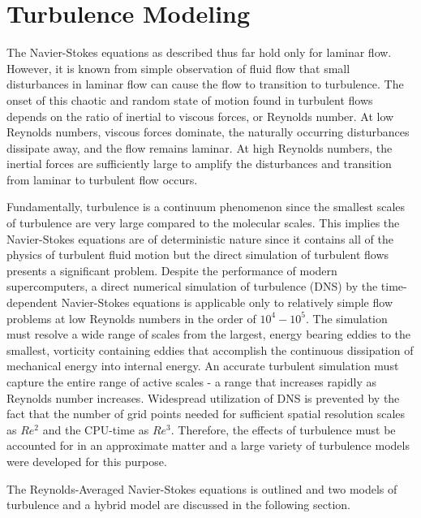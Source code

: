 \section{Turbulence Modeling}

The Navier-Stokes equations as described thus far hold only for laminar flow. However, it is known from simple observation of fluid flow that small disturbances in laminar flow can cause the flow to transition to turbulence. The onset of this chaotic and random state of motion found in turbulent flows depends on the ratio of inertial to viscous forces, or Reynolds number. At low Reynolds numbers, viscous forces dominate, the naturally occurring disturbances dissipate away, and the flow remains laminar. At high Reynolds numbers, the inertial forces are sufficiently large to amplify the disturbances and transition from laminar to turbulent flow occurs.

Fundamentally, turbulence is a continuum phenomenon since the smallest scales of turbulence are very large compared to the molecular scales. This implies the Navier-Stokes equations are of deterministic nature since it contains all of the physics of turbulent fluid motion \cite{BlazekText} but the direct simulation of turbulent flows presents a significant problem. Despite the performance of modern supercomputers, a direct numerical simulation of turbulence (DNS) by the time-dependent Navier-Stokes equations is applicable only to relatively simple flow problems at low Reynolds numbers in the order of $10^4 \minus 10^5$. The simulation must resolve a wide range of scales from the largest, energy bearing eddies to the smallest, vorticity containing eddies that accomplish the continuous dissipation of mechanical energy into internal energy. An accurate turbulent simulation must capture the entire range of active scales - a range that increases rapidly as Reynolds number increases. Widespread utilization of DNS is prevented by the fact that the number of grid points needed for sufficient spatial resolution scales as $Re^2$ and the CPU-time as $Re^3$. Therefore, the effects of turbulence must be accounted for in an approximate matter and a large variety of turbulence models were developed for this purpose.

The Reynolds-Averaged Navier-Stokes equations is outlined and two models of turbulence and a hybrid model are discussed in the following section. 

